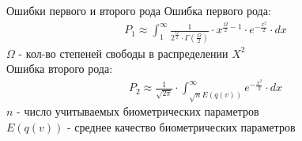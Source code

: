 \begin{frame}{Ошибки первого и второго рода}
    Ошибка первого рода:
    \begin{gather*}
        P_1 \approx \int_1^\infty \frac{1}{2^{\frac{\Omega}{2}} \cdot \Gamma(\frac{\Omega}{2})}
        \cdot x^{\frac{\Omega}{2}-1} \cdot e^{-\frac{x^2}{2}} \cdot dx
    \end{gather*}
    $\Omega$ - кол-во степеней свободы в распределении $X^2$ \\
    Ошибка второго рода:
    \begin{gather*}
        P_2 \approx \frac{1}{\sqrt{2\pi}} \cdot \int_{\sqrt{n}E(q(v))}^{\infty} e^{-\frac{x^2}{2}} \cdot dx
    \end{gather*}
    $n$ - число учитываемых биометрических параметров \\
    $E(q(v))$ - среднее качество биометрических параметров
\end{frame}
